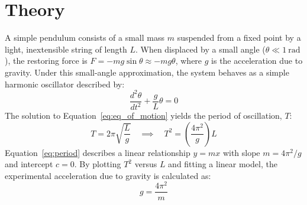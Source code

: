 \section{Theory}
A simple pendulum consists of a small mass $m$ suspended from a fixed point by a light, inextensible string of length $L$. When displaced by a small angle ($\theta \ll \SI{1}{\radian}$), the restoring force is $F = -mg\sin\theta \approx -mg\theta$, where $g$ is the acceleration due to gravity. Under this small-angle approximation, the system behaves as a simple harmonic oscillator described by:
\begin{equation}
  \frac{d^2\theta}{dt^2} + \frac{g}{L}\theta = 0
  \label{eq:eq_of_motion}
\end{equation}
The solution to Equation~\eqref{eq:eq_of_motion} yields the period of oscillation, $T$:
\begin{equation}
  T = 2\pi\sqrt{\frac{L}{g}} \quad \implies \quad T^2 = \left( \frac{4\pi^2}{g} \right) L
  \label{eq:period}
\end{equation}
Equation~\eqref{eq:period} describes a linear relationship $y = mx$ with slope $m = 4\pi^2 / g$ and intercept $c = 0$. By plotting $T^2$ versus $L$ and fitting a linear model, the experimental acceleration due to gravity is calculated as:
\begin{equation}
  g = \frac{4\pi^2}{m}
  \label{eq:g_calculation}
\end{equation}

